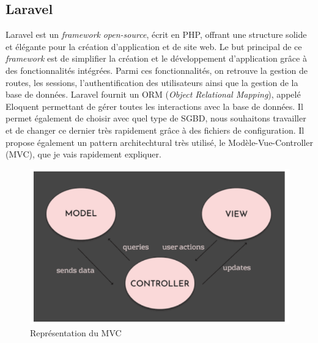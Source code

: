 \subsection{Laravel}
Laravel est un \emph{framework} \emph{open-source}, écrit en PHP, offrant une structure solide et élégante pour la création d'application et de site web. Le but principal de ce \emph{framework} est de simplifier la création et le développement d'application grâce à des fonctionnalités intégrées. Parmi ces fonctionnalités, on retrouve la gestion de routes, les sessions, l'authentification des utilisateurs ainsi que la gestion de la base de données.
Laravel fournit un ORM (\emph{Object Relational Mapping}), appelé Eloquent permettant de gérer toutes les interactions avec la base de données. Il permet également de choisir avec quel type de SGBD, nous souhaitons travailler et de changer ce dernier très rapidement grâce à des fichiers de configuration.
Il propose également un pattern architechtural très utilisé, le Modèle-Vue-Controller (MVC), que je vais rapidement expliquer.
\begin{center}
    \begin{figure}[H]%
        \includegraphics[width=\textwidth]{./assets/figures/MVCExplanation.png}
        \caption{Représentation du MVC \label{MVCExplanation.png}}
    \end{figure}
\end{center}

